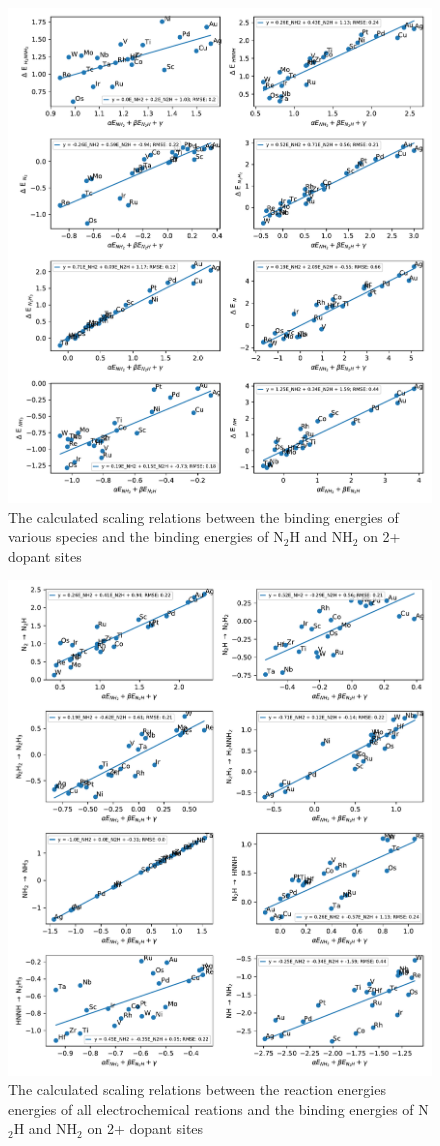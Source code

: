 \begin{figure}
\includegraphics[width=0.8\linewidth]{Images/scaling_species.pdf}
\caption{The calculated scaling relations between the binding energies of various species and the binding energies of N$_2$H and NH$_2$ on 2+ dopant sites}
\label{fig:scaling_species}
\end{figure}

\begin{figure}
\centering
\includegraphics[width=0.8\linewidth]{Images/scaling_reactions.pdf}
\caption{The calculated scaling relations between the reaction energies energies of all electrochemical reations and the binding energies of N$_2$H and NH$_2$ on 2+ dopant sites}
\label{fig:scaling_reactions}
\end{figure}

